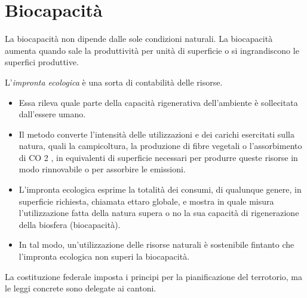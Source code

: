 \documentclass[a4paper]{article}
\begin{document}
\pagebreak

\section{Biocapacità}


La biocapacità non dipende dalle sole condizioni naturali.
La biocapacità aumenta quando sale la produttività per unità di
superficie o si ingrandiscono le superfici produttive.

L'\textit{impronta ecologica} è una sorta di contabilità delle risorse.
\begin{itemize}
    \item Essa rileva quale parte della capacità rigenerativa
        dell'ambiente è sollecitata dall'essere umano.
    \item Il metodo converte l'intensità delle utilizzazioni e dei
        carichi esercitati sulla natura, quali la campicoltura, la
        produzione di fibre vegetali o l'assorbimento di CO 2 , in
        equivalenti di superficie necessari per produrre queste
        risorse in modo rinnovabile o per assorbire le emissioni.
    \item L'impronta ecologica esprime la totalità dei consumi, di qualunque
        genere, in superficie richiesta, chiamata ettaro globale, e mostra
        in quale misura l'utilizzazione fatta della natura supera o no la sua
        capacità di rigenerazione della biosfera (biocapacità). 
    \item In tal modo, un'utilizzazione delle risorse naturali è sostenibile
        fintanto che l'impronta ecologica non superi la biocapacità.
\end{itemize}


La costituzione federale imposta i principi per la pianificazione del terrotorio,
ma le leggi concrete sono delegate ai cantoni.
\end{document}
